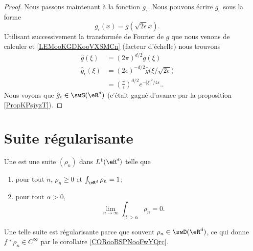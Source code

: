 \begin{proof}
    Nous passons maintenant à la fonction \( g_{\epsilon}\). Nous pouvons écrire \( g_{\epsilon}\) sous la forme
    \begin{equation}
        g_{\epsilon}(x)=g(\sqrt{ 2\epsilon }x).
    \end{equation}
        Utilisant successivement la transformée de Fourier de \( g\) que nous venons de calculer et \ref{LEMooKGDKooVXSMCn} (facteur d'échelle) nous trouvons
        \begin{subequations}
            \begin{align}
                \hat g(\xi)&=(2\pi)^{d/2}g(\xi)\\
                \hat g_{\epsilon}(\xi)&=(2\epsilon)^{-d/2}\hat g\big( \xi/\sqrt{ 2\epsilon } \big)\\
                &=\left( \frac{ \pi }{ \epsilon } \right)^{d/2} e^{-| \xi |^2/4\epsilon} \label{SUBEQooFWIKooGMpFbo}..
            \end{align}
        \end{subequations}
        Nous voyons que \( \hat g_{\epsilon}\in\swS(\eR^d)\)  (c'était gagné d'avance par la proposition \ref{PropKPsjyzT}).
\end{proof}

\section{Suite régularisante}

\begin{definition}      \label{DEFooRIFYooUUUoha}
    Une  est une suite \( (\rho_n)\) dans \( L^1(\eR^d)\) telle que
    \begin{enumerate}
        \item       \label{ITEMooEYXYooAkKeXX}
            pour tout \( n\), \( \rho_n\geq 0\) et \( \int_{\eR^d}\rho_n=1\);
        \item
            pour tout \( \alpha>0\),
            \begin{equation}
                \lim_{n\to \infty} \int_{| t |>\alpha}\rho_n=0.
            \end{equation}
    \end{enumerate}
\end{definition}
Une telle suite est régularisante parce que souvent \( \rho_n\in\swD(\eR^d)\), ce qui donne \( f*\rho_n\in C^{\infty}\) par le corollaire \ref{CORooBSPNooFwYQrc}.

